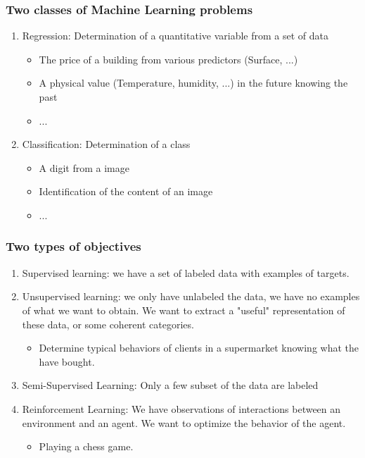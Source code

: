 \documentclass[handout]{beamer}
\begin{document}
\begin{frame}
\frametitle{Two classes of Machine Learning problems}
\begin{enumerate}
\item \alert{Regression}: Determination of a quantitative variable from a set of data
\begin{itemize}
\item The price of a building from various predictors (Surface, ...)
\item A physical value (Temperature, humidity, ...) in the future knowing the past
\item ...
\end{itemize}
\pause
\item \alert{Classification}: Determination of a class 
\begin{itemize}
\item A digit from a image
\item Identification of the content of an image
\item ...
\end{itemize}
\end{enumerate}
\end{frame}
\begin{frame}
\frametitle{Two types of objectives}

\begin{enumerate}[<+->]
\item \alert{Supervised learning}: we have a set of labeled data with examples of targets.
\item \alert{Unsupervised learning}: we only have unlabeled the data, we have no examples of
what we want to obtain. We want to extract a "useful" representation of these data, or
some coherent categories.
\begin{itemize}
\item Determine typical behaviors of clients in a supermarket knowing what the have bought.
\end{itemize}
\item \alert{Semi-Supervised Learning}: Only a few subset of the data are labeled
\item \alert{Reinforcement Learning}: We have observations of interactions between an environment and an agent. We want to optimize the behavior of the agent.
\begin{itemize}
\item Playing a chess game.
\end{itemize}
\end{enumerate}
\end{frame}
\end{document}

